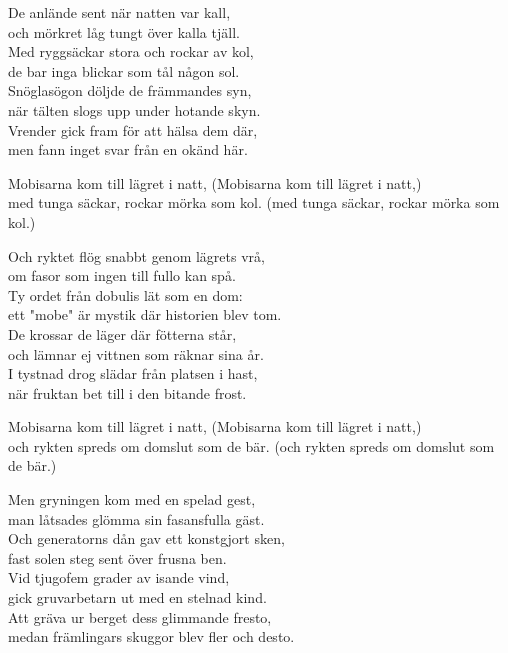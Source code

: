 \begin{lyrics}
De anlände sent när natten var kall,\\
och mörkret låg tungt över kalla tjäll.\\
Med ryggsäckar stora och rockar av kol,\\
de bar inga blickar som tål någon sol.\\
Snöglasögon döljde de främmandes syn,\\
när tälten slogs upp under hotande skyn.\\
Vrender gick fram för att hälsa dem där,\\
men fann inget svar från en okänd här.

Mobisarna kom till lägret i natt,
(Mobisarna kom till lägret i natt,)\\
med tunga säckar, rockar mörka som kol.
(med tunga säckar, rockar mörka som kol.)

Och ryktet flög snabbt genom lägrets vrå,\\
om fasor som ingen till fullo kan spå.\\
Ty ordet från dobulis lät som en dom:\\
ett "mobe" är mystik där historien blev tom.\\
De krossar de läger där fötterna står,\\
och lämnar ej vittnen som räknar sina år.\\
I tystnad drog slädar från platsen i hast,\\
när fruktan bet till i den bitande frost.

Mobisarna kom till lägret i natt,
(Mobisarna kom till lägret i natt,)\\
och rykten spreds om domslut som de bär.
(och rykten spreds om domslut som de bär.)

Men gryningen kom med en spelad gest,\\
man låtsades glömma sin fasansfulla gäst.\\
Och generatorns dån gav ett konstgjort sken,\\
fast solen steg sent över frusna ben.\\
Vid tjugofem grader av isande vind,\\
gick gruvarbetarn ut med en stelnad kind.\\
Att gräva ur berget dess glimmande fresto,\\
medan främlingars skuggor blev fler och desto.


\end{lyrics}
